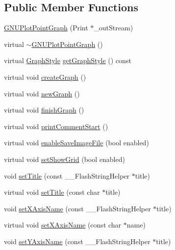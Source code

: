 \subsection*{Public Member Functions}
\begin{DoxyCompactItemize}
\item 
\hyperlink{class_g_n_u_plot_point_graph_a2b97fa221bf9012787cd20df14dc1c3c}{G\+N\+U\+Plot\+Point\+Graph} (Print $\ast$\+\_\+out\+Stream)
\item 
virtual \hyperlink{class_g_n_u_plot_point_graph_a41cd525a889e78bcfc3359f52a2afecb}{$\sim$\+G\+N\+U\+Plot\+Point\+Graph} ()
\item 
virtual \hyperlink{_serial_graph_8h_adc73bce6b7e6c4ecf37dde452d6a385e}{Graph\+Style} \hyperlink{class_g_n_u_plot_point_graph_aeeae395426112202d3617ff66d836c99}{get\+Graph\+Style} () const 
\item 
virtual void \hyperlink{class_g_n_u_plot_x_y_graph_base_a8389f830ff330dfb705e00d31053e130}{create\+Graph} ()
\item 
virtual void \hyperlink{class_g_n_u_plot_base_a4d4da234cfdeb99ec3228ef7b2df8a50}{new\+Graph} ()
\item 
virtual void \hyperlink{class_g_n_u_plot_base_aa4b0574c35fbee4dc5f25451eaf956dd}{finish\+Graph} ()
\item 
virtual void \hyperlink{class_g_n_u_plot_base_a219601bd41203477ae73a18d18dd7443}{print\+Comment\+Start} ()
\item 
virtual void \hyperlink{class_serial_graph_a28b020807c52c113685aa6a31f836c52}{enable\+Save\+Image\+File} (bool enabled)
\item 
virtual void \hyperlink{class_serial_graph_abf488e449d6d786bc01478793d0094ad}{set\+Show\+Grid} (bool enabled)
\item 
void \hyperlink{class_serial_graph_a4db09b008589914b71b2ee8b1873db7a}{set\+Title} (const \+\_\+\+\_\+\+Flash\+String\+Helper $\ast$title)
\item 
virtual void \hyperlink{class_serial_graph_ad726b2c84cec50c2d4bfe769e62a9bcd}{set\+Title} (const char $\ast$title)
\item 
void \hyperlink{class_serial_graph_afdb759a860c41de2fc4cfe78519b9fc0}{set\+X\+Axis\+Name} (const \+\_\+\+\_\+\+Flash\+String\+Helper $\ast$title)
\item 
virtual void \hyperlink{class_serial_graph_ac7f30036f5006091af51204a4d9efaf2}{set\+X\+Axis\+Name} (const char $\ast$name)
\item 
void \hyperlink{class_serial_graph_abfc46c15cf8e1b4362a7f51cb11c7bdb}{set\+Y\+Axis\+Name} (const \+\_\+\+\_\+\+Flash\+String\+Helper $\ast$title)

\end{DoxyCompactItemize}
